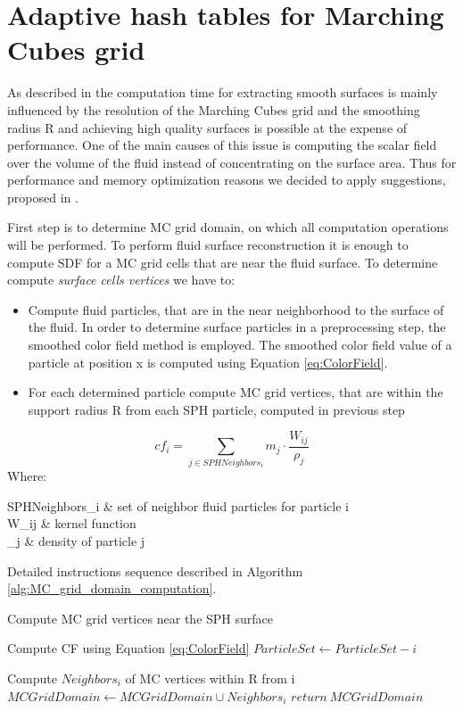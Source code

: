 \section{Adaptive hash tables for Marching Cubes grid}
As described in \cite{Akinchi} the computation time for extracting smooth surfaces is mainly influenced by
the resolution of the Marching Cubes grid and the smoothing radius R and achieving high quality surfaces is possible at the expense of performance. One of the main causes of this issue is computing the scalar field over the volume of the fluid instead of concentrating on the surface area. Thus for performance and memory optimization reasons we decided to apply suggestions, proposed in \cite{Akinchi}.

First step is to determine MC grid domain, on which all computation operations will be performed. To perform fluid surface reconstruction it is enough to compute SDF for a MC grid cells that are near the fluid surface. To determine compute \emph{surface cells vertices} we have to:
\begin{itemize}
		\item Compute fluid particles, that are in the near neighborhood to the surface of the fluid. In order to determine surface particles in a preprocessing step, the smoothed color field method \cite{ColorField} is employed.  The smoothed color field value of a particle at position x is computed using Equation \ref{eq:ColorField}.
		\item For each determined particle compute MC grid vertices, that are within the support radius R from each SPH particle, computed in previous step 
\end{itemize}
\begin{equation} \label{eq:ColorField}
	cf_i = \sum_{j\in SPHNeighbors_i}{m_j \cdot \dfrac{W_{ij}}{\rho_j}}
\end{equation}
Where:
\begin{conditions}
	SPHNeighbors_i & set of neighbor fluid particles for particle i\\
	W_{ij} & kernel function\\
	\rho_j & density of particle j\\
\end{conditions}
Detailed instructions sequence described in Algorithm \ref{alg:MC_grid_domain_computation}.
\begin{algorithm}
	\scriptsize
	\caption{Compute MC grid vertices near the SPH surface}
	\label{alg:MC_grid_domain_computation}
	\begin{algorithmic}
			\State Compute CF using Equation \ref{eq:ColorField}
				\State $ParticleSet \gets ParticleSet - i$
			\EndIf

		\EndFor
			\State Compute $Neighbors_i$ of MC vertices within R from  i
			\State $MCGridDomain \gets MCGridDomain \cup Neighbors_i$
		\EndFor
		\State $return\ MCGridDomain$
	\end{algorithmic}
\end{algorithm} 

